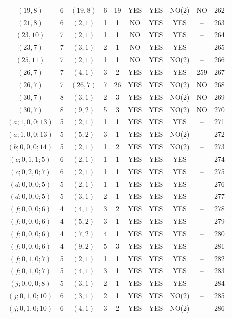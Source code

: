 \begin{longtable}{|c|c|c|c|c|c|c|c|c|c|}
$(19, 8)$ & 6 & $(19, 8)$ & 6 & 19 & YES & YES & NO(2) & NO & 262\\
$(21, 8)$ & 6 & $(2, 1)$ & 1 & 1 & NO & YES & YES & -- & 263\\
$(23, 10)$ & 7 & $(2, 1)$ & 1 & 1 & NO & YES & YES & -- & 264\\
$(23, 7)$ & 7 & $(3, 1)$ & 2 & 1 & NO & YES & YES & -- & 265\\
$(25, 11)$ & 7 & $(2, 1)$ & 1 & 1 & NO & YES & NO(2) & -- & 266\\
$(26, 7)$ & 7 & $(4, 1)$ & 3 & 2 & YES & YES & YES & 259 & 267\\
$(26, 7)$ & 7 & $(26, 7)$ & 7 & 26 & YES & YES & NO(2) & NO & 268\\
$(30, 7)$ & 8 & $(3, 1)$ & 2 & 3 & YES & YES & NO(2) & NO & 269\\
$(30, 7)$ & 8 & $(9, 2)$ & 5 & 3 & YES & YES & NO(2) & NO & 270\\
$(a; 1, 0, 0; 13)$ & 5 & $(2, 1)$ & 1 & 1 & YES & YES & YES & -- & 271\\
$(a; 1, 0, 0; 13)$ & 5 & $(5, 2)$ & 3 & 1 & YES & YES & NO(2) & -- & 272\\
$(b; 0, 0, 0; 14)$ & 5 & $(2, 1)$ & 1 & 2 & YES & YES & NO(2) & -- & 273\\
$(c; 0, 1, 1; 5)$ & 6 & $(2, 1)$ & 1 & 1 & YES & YES & YES & -- & 274\\
$(c; 0, 2, 0; 7)$ & 6 & $(2, 1)$ & 1 & 1 & YES & YES & YES & -- & 275\\
$(d; 0, 0, 0; 5)$ & 5 & $(2, 1)$ & 1 & 1 & YES & YES & YES & -- & 276\\
$(d; 0, 0, 0; 5)$ & 5 & $(3, 1)$ & 2 & 1 & YES & YES & YES & -- & 277\\
$(f; 0, 0, 0; 6)$ & 4 & $(4, 1)$ & 3 & 2 & YES & YES & YES & -- & 278\\
$(f; 0, 0, 0; 6)$ & 4 & $(5, 2)$ & 3 & 1 & YES & YES & YES & -- & 279\\
$(f; 0, 0, 0; 6)$ & 4 & $(7, 2)$ & 4 & 1 & YES & YES & YES & -- & 280\\
$(f; 0, 0, 0; 6)$ & 4 & $(9, 2)$ & 5 & 3 & YES & YES & YES & -- & 281\\
$(f; 0, 1, 0; 7)$ & 5 & $(2, 1)$ & 1 & 1 & YES & YES & YES & -- & 282\\
$(f; 0, 1, 0; 7)$ & 5 & $(4, 1)$ & 3 & 1 & YES & YES & YES & -- & 283\\
$(j; 0, 0, 0; 8)$ & 5 & $(3, 1)$ & 2 & 1 & YES & YES & YES & -- & 284\\
$(j; 0, 1, 0; 10)$ & 6 & $(3, 1)$ & 2 & 1 & YES & YES & NO(2) & -- & 285\\
$(j; 0, 1, 0; 10)$ & 6 & $(4, 1)$ & 3 & 2 & YES & YES & NO(2) & -- & 286
\end{longtable}
